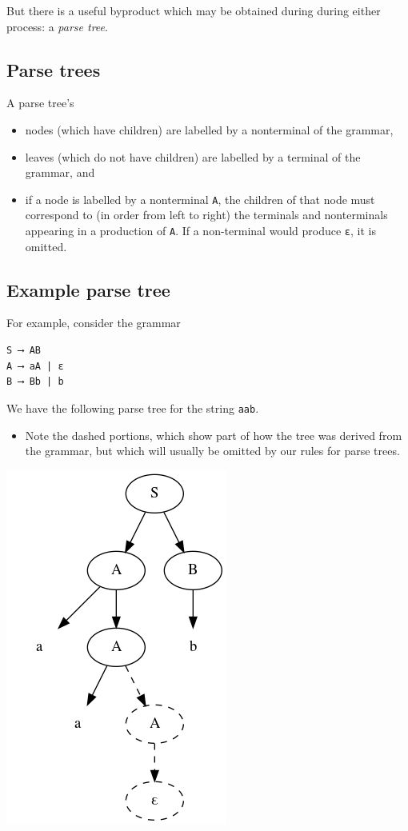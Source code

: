 \documentclass[11pt]{article}
\theoremstyle{definition}
\begin{document}
But there is a useful byproduct which may be obtained during
during either process: a \emph{parse tree}.

\subsection{Parse trees}
\label{sec:org61b67e8}
A parse tree's
\begin{itemize}
\item nodes (which have children) are
labelled by a nonterminal of the grammar,
\item leaves (which do not have children) are
labelled by a terminal of the grammar, and
\item if a node is labelled by a nonterminal \texttt{A},
the children of that node must correspond to
(in order from left to right)
the terminals and nonterminals appearing in a production of \texttt{A}.
If a non-terminal would produce \texttt{ε}, it is omitted.
\end{itemize}

\subsection{Example parse tree}
\label{sec:org237a7cb}
For example, consider the grammar
\begin{verbatim}
S ⟶ AB
A ⟶ aA | ε
B ⟶ Bb | b
\end{verbatim}

We have the following parse tree for the string \texttt{aab}.
\begin{itemize}
\item Note the dashed portions, which show part of how the tree
was derived from the grammar,
but which will usually be omitted by our rules for parse trees.
\end{itemize}
\includegraphics{media/parse-tree-example-aab.png}
\end{document}
